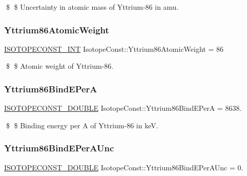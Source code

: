 \$ \$ Uncertainty in atomic mass of Yttrium-\/86 in amu. \mbox{\label{group___isotope_const-_yttrium-_y86_ga45510e216757dd4b854f8a43545f8237}} 
\subsubsection{\texorpdfstring{Yttrium86\+Atomic\+Weight}{Yttrium86AtomicWeight}}
{\footnotesize\ttfamily \mbox{\hyperlink{group___isotope_const-_macros_ga5f18360b3e99483a35c32d789e62621c}{I\+S\+O\+T\+O\+P\+E\+C\+O\+N\+S\+T\+\_\+\+I\+NT}} Isotope\+Const\+::\+Yttrium86\+Atomic\+Weight = 86}

\$ \$ Atomic weight of Yttrium-\/86. \mbox{\label{group___isotope_const-_yttrium-_y86_ga1bb085b184fe99d72818288db0fbddc8}} 
\subsubsection{\texorpdfstring{Yttrium86\+Bind\+E\+PerA}{Yttrium86BindEPerA}}
{\footnotesize\ttfamily \mbox{\hyperlink{group___isotope_const-_macros_ga8f45a7272ce02c0b4c65c44636ed719a}{I\+S\+O\+T\+O\+P\+E\+C\+O\+N\+S\+T\+\_\+\+D\+O\+U\+B\+LE}} Isotope\+Const\+::\+Yttrium86\+Bind\+E\+PerA = 8638.}

\$ \$ Binding energy per A of Yttrium-\/86 in keV. \mbox{\label{group___isotope_const-_yttrium-_y86_ga03561fc433bf38dc3baea3ab0555b3f6}} 
\subsubsection{\texorpdfstring{Yttrium86\+Bind\+E\+Per\+A\+Unc}{Yttrium86BindEPerAUnc}}
{\footnotesize\ttfamily \mbox{\hyperlink{group___isotope_const-_macros_ga8f45a7272ce02c0b4c65c44636ed719a}{I\+S\+O\+T\+O\+P\+E\+C\+O\+N\+S\+T\+\_\+\+D\+O\+U\+B\+LE}} Isotope\+Const\+::\+Yttrium86\+Bind\+E\+Per\+A\+Unc = 0.}

